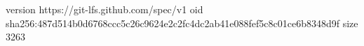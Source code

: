version https://git-lfs.github.com/spec/v1
oid sha256:487d514b0d6768ccc5c26c9624e2c2fc4dc2ab41e088fef5c8c01ce6b8348d9f
size 3263
